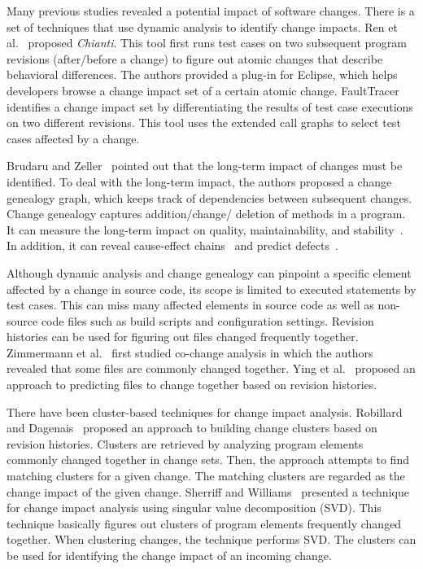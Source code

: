 Many previous studies revealed a potential impact of software changes. There is a
set of techniques that use dynamic analysis to identify change impacts. Ren et
al.~\cite{ren_chianti:_2004} proposed \emph{Chianti}. This tool first runs test
cases on two subsequent program revisions (after/before a change) to figure out
atomic changes that describe behavioral differences. The authors provided a
plug-in for Eclipse, which helps developers browse a change impact set of a
certain atomic change. FaultTracer~\cite{zhang_faulttracer:_2012} identifies
a change impact set by differentiating the results of test case executions on
two different revisions. This tool uses the extended call graphs to select
test cases affected by a change.

Brudaru and Zeller~\cite{brudaru_what_2008} pointed out that the long-term
impact of changes must be identified. To deal with the long-term impact, the authors proposed
a change genealogy graph, which keeps track of dependencies between
subsequent changes. Change genealogy captures addition/change/ deletion of
methods in a program. It can measure the long-term impact on quality,
maintainability, and stability~\cite{herzig_capturing_2010}. 
In addition, it can reveal cause-effect chains~\cite{herzig_mining_2011} and predict
defects~\cite{herzig_predicting_2013}.


Although dynamic analysis and change genealogy can pinpoint a specific element
affected by a change in source code, its scope is limited to executed statements
by test cases. This can miss many affected elements in source code as well as
non-source code files such as build scripts and configuration settings.
Revision histories can be used for figuring out files changed frequently
together. Zimmermann et al.~\cite{zimmermann_mining_2004} first studied
co-change analysis in which the authors revealed that some files are
commonly changed together. Ying et al.~\cite{ying_predicting_2004} proposed an
approach to predicting files to change together based on revision histories.


There have been cluster-based techniques for change impact analysis. Robillard
and Dagenais~\cite{robillard_retrieving_2008} proposed an approach to building
change clusters based on revision histories. Clusters are retrieved by analyzing
program elements commonly changed together in change sets. Then, the approach
attempts to find matching clusters for a given change. The matching clusters are
regarded as the change impact of the given change. Sherriff and
Williams~\cite{sherriff_empirical_2008} presented a technique for change impact
analysis using singular value decomposition (SVD). This technique basically
figures out clusters of program elements frequently changed together. When clustering
changes, the technique performs SVD. The clusters can be used for identifying
the change impact of an incoming change. 
 
